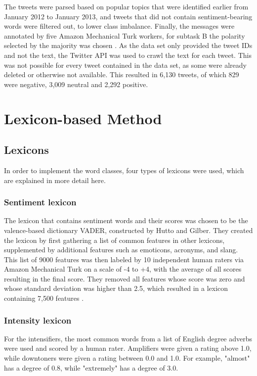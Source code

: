 The tweets were parsed based on popular topics that were identified earlier from January 2012 to January 2013, and tweets that did not contain sentiment-bearing words were filtered out, to lower class imbalance. Finally, the messages were annotated by five Amazon Mechanical Turk workers, for subtask B the polarity selected by the majority was chosen \cite{nakov-etal-2013-semeval}. As the data set only provided the tweet IDs and not the text, the Twitter API was used to crawl the text for each tweet. This was not possible for every tweet contained in the data set, as some were already deleted or otherwise not available. This resulted in 6,130 tweets, of which 829 were negative, 3,009 neutral and 2,292 positive.

\section{Lexicon-based Method}

\subsection{Lexicons}
In order to implement the word classes, four types of lexicons were used, which are explained in more detail here.

\subsubsection{Sentiment lexicon}
The lexicon that contains sentiment words and their scores was chosen to be the valence-based dictionary VADER, constructed by Hutto and Gilber. They created the lexicon by first gathering a list of common features in other lexicons, supplemented by additional features such as emoticons, acronyms, and slang. This list of 9000 features was then labeled by 10 independent human raters via Amazon Mechanical Turk on a scale of -4 to +4, with the average of all scores resulting in the final score. They removed all features whose score was zero and whose standard deviation was higher than 2.5, which resulted in a lexicon containing 7,500 features \cite{DBLP:conf/icwsm/HuttoG14}.

\subsubsection{Intensity lexicon}
For the intensifiers, the most common words from a list of English degree adverbs \cite{wiki:adverbs} were used and scored by a human rater. Amplifiers were given a rating above 1.0, while downtoners were given a rating between 0.0 and 1.0. For example, "almost" has a degree of 0.8, while "extremely" has a degree of 3.0.


